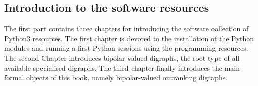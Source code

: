 % 
%
%

\begin{partbacktext}
\part{Introduction to the \Digraph software resources}
\noindent The first part contains three chapters for introducing the \Digraph software collection of Python3 resources. The first chapter is devoted to the installation of the \Digraph Python modules and running a first Python sessions using the  programming resources. The second Chapter introduces bipolar-valued digraphs, the root type of all available specialised digraphs. The third chapter finally introduces the main formal objects of this book, namely bipolar-valued outranking digraphs.

\end{partbacktext}